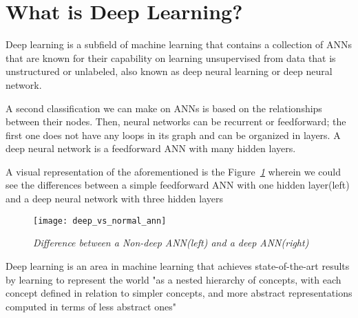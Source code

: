\section{What is Deep Learning?}

Deep learning is a subfield of machine learning that contains a collection of ANNs that are known for
their capability on learning unsupervised from data that is unstructured or unlabeled,
also known as deep neural learning or deep neural network.

A second classification we can make on ANNs is based on the relationships between their nodes.
Then, neural networks can be recurrent or feedforward;
the first one does not have any loops in its graph and can be organized in layers.
A deep neural network is a feedforward ANN with many hidden layers.

A visual representation of the aforementioned is the Figure\emph{~\ref{fig:deep_vs_normal}}
wherein we could see the differences between a simple feedforward ANN with one
hidden layer(left) and a deep neural network with three hidden layers
\begin{figure}[h]
    \centering
    \texttt{[image: deep\_vs\_normal\_ann]}
    \caption{\emph{Difference between a Non-deep ANN(left) and a deep ANN(right) \cite{deepLearningBook}}}
    \label{fig:deep_vs_normal}
\end{figure}

Deep learning is an area in machine learning that achieves state-of-the-art
results by learning to represent the world "as a nested hierarchy of concepts,
with each concept defined in relation to simpler concepts,
and more abstract representations computed in terms of less abstract ones" \cite{Goodfellow-et-al-2016}
